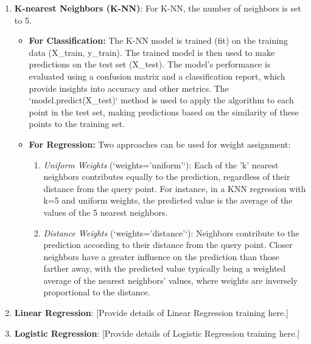 \documentclass[a4paper]{article}
\begin{document}
\begin{enumerate}
	\item \textbf{K-nearest Neighbors (K-NN)}: 
	For K-NN, the number of neighbors is set to 5.
	\begin{itemize}
		\item \textbf{For Classification:}
		The K-NN model is trained (fit) on the training data (X\_train, y\_train). The trained model is then used to make predictions on the test set (X\_test). The model's performance is evaluated using a confusion matrix and a classification report, which provide insights into accuracy and other metrics. The `model.predict(X\_test)` method is used to apply the algorithm to each point in the test set, making predictions based on the similarity of these points to the training set.
		
		\item \textbf{For Regression:}
		Two approaches can be used for weight assignment:
		\begin{enumerate}
			\item \textit{Uniform Weights} (`weights='uniform'`): Each of the 'k' nearest neighbors contributes equally to the prediction, regardless of their distance from the query point. For instance, in a KNN regression with k=5 and uniform weights, the predicted value is the average of the values of the 5 nearest neighbors.
			
			\item \textit{Distance Weights} (`weights='distance'`): Neighbors contribute to the prediction according to their distance from the query point. Closer neighbors have a greater influence on the prediction than those farther away, with the predicted value typically being a weighted average of the nearest neighbors' values, where weights are inversely proportional to the distance.
		\end{enumerate}
	\end{itemize}
	
	\item \textbf{Linear Regression}: 
	[Provide details of Linear Regression training here.]
	
	\item \textbf{Logistic Regression}: 
	[Provide details of Logistic Regression training here.]
\end{enumerate}
\end{document}
